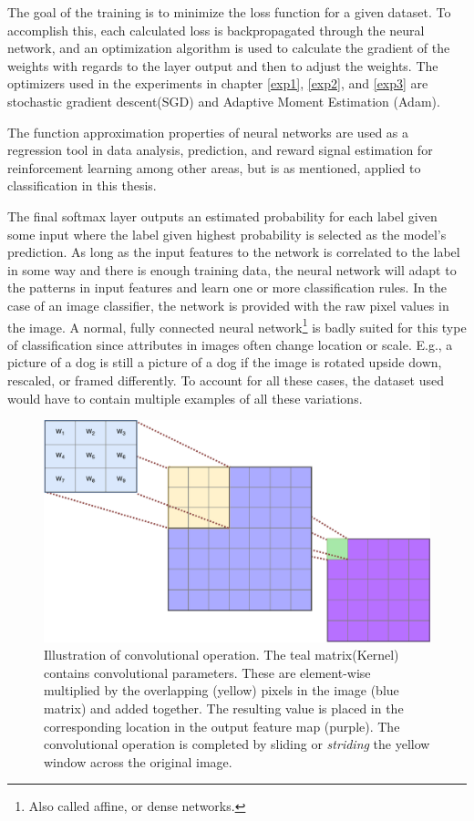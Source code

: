 The goal of the training is to minimize the loss function for a given dataset. To accomplish this, each calculated loss is backpropagated through the neural network, and an optimization algorithm is used to calculate the gradient of the weights with regards to the layer output and then to adjust the weights. The optimizers used in the experiments in chapter \ref{exp1}, \ref{exp2}, and \ref{exp3} are stochastic gradient descent(SGD)\cite{sgd} and Adaptive Moment Estimation (Adam)\cite{adam}. 

The function approximation properties of neural networks are used as a regression tool in data analysis, prediction, and reward signal estimation for reinforcement learning among other areas, but is as mentioned, applied to classification in this thesis.

The final softmax layer outputs an estimated probability for each label given some input where the label given highest probability is selected as the model's prediction. As long as the input features to the network is correlated to the label in some way and there is enough training data, the neural network will adapt to the patterns in input features and learn one or more classification rules. In the case of an image classifier, the network is provided with the raw pixel values in the image. A normal, fully connected neural network\footnote{Also called affine, or dense networks.} is badly suited for this type of classification since attributes in images often change location or scale. E.g., a picture of a dog is still a picture of a dog if the image is rotated upside down, rescaled, or framed differently. To account for all these cases, the dataset used would have to contain multiple examples of all these variations.
\begin{figure}[ht] 
    \centering
    \includegraphics[width=\linewidth]{Chapters/2.Background/figures/convolution.pdf}
    \caption[Illustration of convolutional operation.]{Illustration of convolutional operation. The teal matrix(Kernel) contains convolutional parameters. These are element-wise multiplied by the overlapping (yellow) pixels in the image (blue matrix) and added together. The resulting value is placed in the corresponding location in the output feature map (purple). The convolutional operation is completed by sliding or \textit{striding} the yellow window across the original image.}
    \label{fig:conv}
\end{figure}

